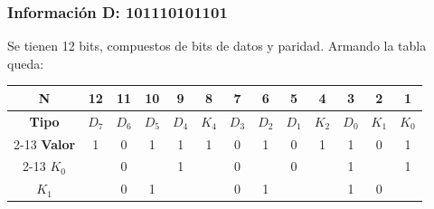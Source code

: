 \subsubsection{Información D: 101110101101}
\sangria{} Se tienen 12 bits, compuestos de bits de datos y paridad. Armando la tabla queda:
\begin{center}
\begin{tabular}{ccccccccccccc}
\rowcolor[HTML]{FFFFC7} 
\cellcolor[HTML]{FCFF2F}\textbf{N}     & 12                        & 11                        & 10                        & 9                         & 8                         & 7                         & 6                         & 5                         & 4                         & 3                         & 2                         & 1                         \\ \hline
\rowcolor[HTML]{CBCEFB} 
\cellcolor[HTML]{9698ED}\textbf{Tipo}  & $D_7$                     & $D_6$                     & $D_5$                     & $D_4$                     & $K_4$                     & $D_3$                     & $D_2$                     & $D_1$                     & $K_2$                     & $D_0$                     & $K_1$                     & $K_0$                     \\ \cline{2-13} 
\rowcolor[HTML]{FFCCC9} 
\cellcolor[HTML]{FD6864}\textbf{Valor} & 1                         & 0                         & 1                         & 1                         & 1                         & 0                         & 1                         & 0                         & 1                         & 1                         & 0                         & 1                         \\ \cline{2-13} 
\cellcolor[HTML]{9AFF99}$K_0$          &                           & \cellcolor[HTML]{96FFFB}0 &                           & \cellcolor[HTML]{96FFFB}1 &                           & \cellcolor[HTML]{96FFFB}0 &                           & \cellcolor[HTML]{96FFFB}0 &                           & \cellcolor[HTML]{96FFFB}1 &                           & \cellcolor[HTML]{96FFFB}1 \\
\cellcolor[HTML]{9AFF99}$K_1$          &                           & \cellcolor[HTML]{96FFFB}0 & \cellcolor[HTML]{96FFFB}1 &                           &                           & \cellcolor[HTML]{96FFFB}0 & \cellcolor[HTML]{96FFFB}1 &                           &                           & \cellcolor[HTML]{96FFFB}1 & \cellcolor[HTML]{96FFFB}0 &                           \\

\end{tabular}
\end{center}
